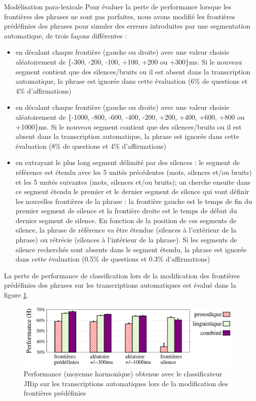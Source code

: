\documentclass{style/these}
\begin{document}
\begin{part}{Modélisation para-lexicale}
Pour évaluer la perte de performance lorsque les frontières des phrases ne sont pas parfaites, nous avons modifié les frontières prédéfinies des phrases pour simuler des erreurs introduites par une segmentation automatique,  de trois façons différentes : 

\begin{itemize}
\item en décalant chaque frontière (gauche ou droite) avec une valeur choisie aléatoirement de \{-300, -200, -100, +100, +200 ou +300\}ms. Si le nouveau segment contient que des silences/bruits ou il est absent dans la transcription automatique, la phrase est ignorée dans cette évaluation  (6\% de questions et 4\% d'affirmations)
\item en décalant chaque frontière (gauche ou droite) avec une valeur choisie aléatoirement de \{-1000, -800, -600, -400, -200, +200, +400, +600, +800 ou +1000\}ms. Si le nouveau segment contient que des silences/bruits ou il est absent dans la transcription automatique, la phrase est ignorée dans cette évaluation (8\% de questions et 4\% d'affirmations)
\item en extrayant le plus long segment délimité par des silences : le segment de référence est étendu avec les 5 unités précédentes (mots, silences et/ou bruits) et les 5 unités suivantes (mots, silences et/ou bruits); on cherche ensuite dans ce segment étendu le premier et le dernier segment de silence qui vont définir les nouvelles frontières de la phrase : la frontière gauche est le temps de fin du premier segment de silence et la frontière droite est le temps de début du dernier segment de silence. En fonction de la position de ces segments de silence, la phrase de référence va être étendue (silences à l'extérieur de la phrase) ou rétrécie (silences à l'intérieur de la phrase). Si les segments de silence recherchés sont absents dans le segment étendu, la phrase est ignorée dans cette évaluation (0.5\% de questions et 0.3\% d'affirmations)     
\end{itemize}

La perte de performance de classification lors de la modification des frontières prédéfinies des phrases sur les transcriptions automatiques est évalué dans la figure \ref{Fig:QD-automatic-differentBorders}. 

\begin{figure}[h!]
\centering
\includegraphics[scale=0.58]{images/results/differentBoundaries-JRip_onAutomatic_legendPLC.pdf}
\caption{Performance (moyenne harmonique) obtenue avec le classificateur JRip sur les transcriptions automatiques lors de la modification des frontières prédéfinies}
\label{Fig:QD-automatic-differentBorders}
\end{figure}


\end{part}
\end{document}
